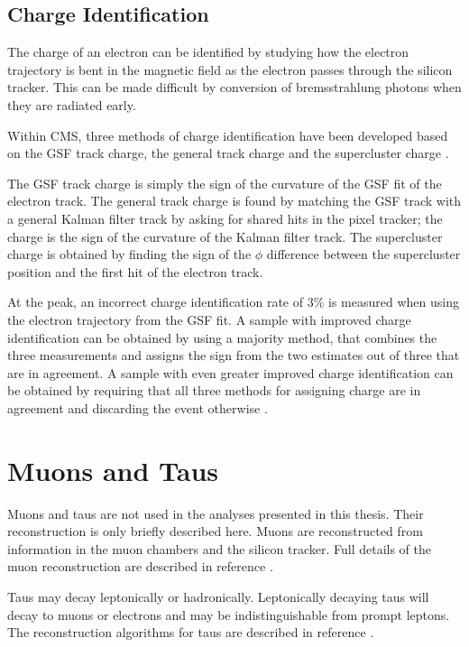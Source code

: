 \subsection{Charge Identification}
\label{sec:charge}
The charge of an electron can be identified by studying how the electron
trajectory is bent in the magnetic field as the electron passes through the
silicon tracker. This can be made difficult by conversion of bremsstrahlung
photons when they are radiated early.

Within CMS, three methods of charge identification have been developed based on
the {GSF} track charge, the general track charge and the supercluster charge
\cite{adam2009electron}. 

The {GSF} track charge is simply the sign of the curvature of the {GSF} fit of
the electron track.  The general track charge is found by matching the {GSF}
track with a general Kalman filter track by asking for shared hits in the pixel
tracker; the charge is the sign of the curvature of the Kalman filter track.
The supercluster charge is obtained by finding the sign of the $\phi$ difference
between the supercluster position and the first hit of the electron track.

At the \PZ peak, an incorrect charge identification rate of \unit{3}{\%}
\cite{adam2009electron} is measured when using the electron trajectory from the
{GSF} fit.  A sample with improved charge identification can be obtained by
using a majority method, that combines the three measurements and assigns the
sign from the two estimates out of three that are in agreement.  A sample with
even greater improved charge identification can be obtained by requiring that
all three methods for assigning charge are in agreement and discarding the event
otherwise \cite{adam2009electron}.

\section{Muons and Taus}
Muons and taus are not used in the analyses presented in
this thesis. Their reconstruction is only briefly described here.  Muons are
reconstructed from information in the muon chambers and the silicon tracker.
Full details of the muon reconstruction are described in reference
\cite{collaboration2010muon}.

Taus may decay leptonically or hadronically. Leptonically decaying taus will
decay to muons or electrons and may be indistinguishable from prompt
leptons. The reconstruction algorithms for taus are described in reference
\cite{collaboration2012tau}.

